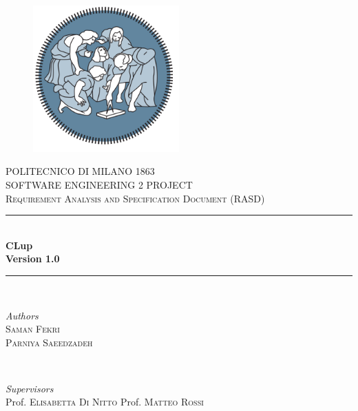 \begin{titlepage}

	\center %

    \begin{figure}[H]
      \centering
      \includegraphics[width=0.5\textwidth,keepaspectratio]{images/PolimiLogo1.png}
    \end{figure}
    
	\textsc{\LARGE POLITECNICO DI MILANO 1863}\\[2cm]

	\textsc{\Large SOFTWARE ENGINEERING 2 PROJECT }\\[0.5cm]

	\textsc{\large Requirement Analysis and Specification Document (RASD)}\\[0.5cm]
	
	\rule{\linewidth}{0.5mm}\\[0.4cm]
	{\huge\bfseries CLup}\\[0.4cm]
	\textbf{Version 1.0}\\

	\rule{\linewidth}{0.5mm}\\[1.5cm]

	\begin{minipage}{0.4\textwidth}
		\begin{flushleft}
			\large
			\textit{Authors}\\
			 \textsc{Saman Fekri} \\
			 \textsc{Parniya Saeedzadeh}
		\end{flushleft}
	\end{minipage}
	~
	\begin{minipage}{0.5\textwidth}
		\begin{flushright}
			\large
			\textit{Supervisors}\\
			Prof. \textsc {Elisabetta Di Nitto}
			Prof. \textsc {Matteo Rossi}
		\end{flushright}
	\end{minipage}
	

\end{titlepage}
